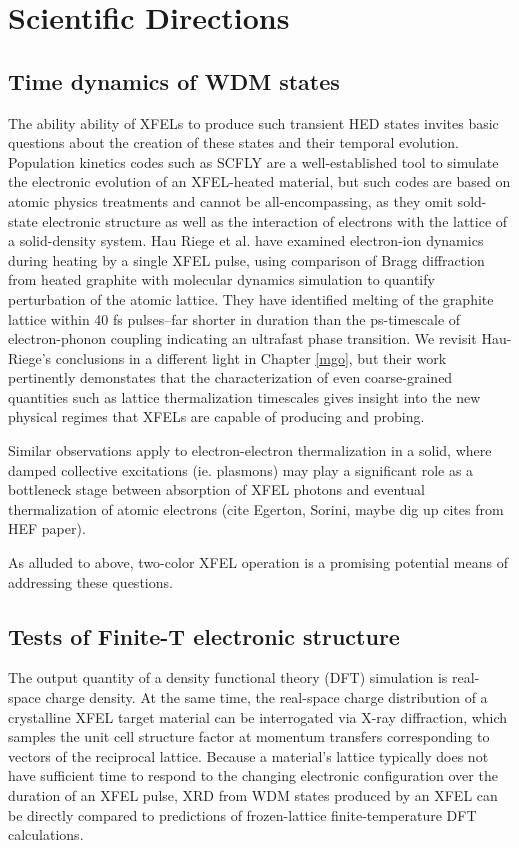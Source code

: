 \documentclass [11pt, proquest, article] {uwthesis}[2016/11/22]
\begin{document}
\section{Scientific Directions}
\subsection{Time dynamics of WDM states}
The ability ability of XFELs to produce such transient HED states invites basic questions about the creation of these states and their temporal evolution. Population kinetics codes such as SCFLY are a well-established tool to simulate the electronic evolution of an XFEL-heated material, but such codes are based on atomic physics treatments and cannot be all-encompassing, as they omit sold-state electronic structure as well as the interaction of electrons with the lattice of a solid-density system.  Hau Riege et al. have examined electron-ion dynamics during heating by a single XFEL pulse, using comparison of Bragg diffraction from heated graphite with molecular dynamics simulation to quantify perturbation of the atomic lattice. They have identified melting of the graphite lattice within 40 fs pulses--far shorter in duration than the ps-timescale of electron-phonon coupling indicating an ultrafast phase transition. We revisit Hau-Riege's conclusions in a different light in Chapter \ref{mgo}, but their work pertinently demonstates that the characterization of even coarse-grained quantities such as lattice thermalization timescales gives insight into the new physical regimes that XFELs are capable of producing and probing. 

Similar observations apply to electron-electron thermalization in a solid, where damped collective excitations (ie. plasmons) may play a significant role as a bottleneck stage between absorption of XFEL photons and eventual thermalization of atomic electrons (cite Egerton, Sorini, maybe dig up cites from HEF paper). 

As alluded to above, two-color XFEL operation is a promising potential means of addressing these questions. 

\subsection{Tests of Finite-T electronic structure}
\label{finite_t_theory}
The output quantity of a density functional theory (DFT) simulation is real-space charge density. At the same time, the real-space charge distribution of a crystalline XFEL target material can be interrogated via X-ray diffraction, which samples the unit cell structure factor at momentum transfers corresponding to vectors of the reciprocal lattice. Because a material's lattice typically does not have sufficient time to respond to the changing electronic configuration over the duration of an XFEL pulse, XRD from WDM states produced by an XFEL can be directly compared to predictions of frozen-lattice finite-temperature DFT calculations.
\end{document}
